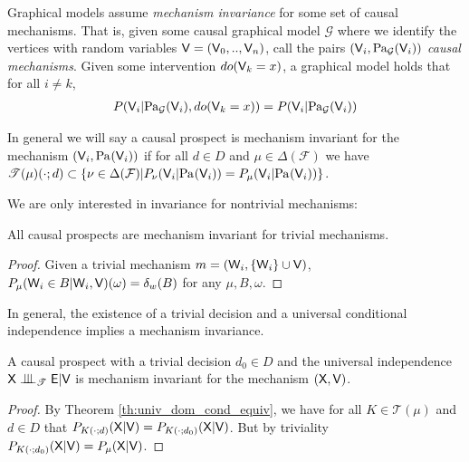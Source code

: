 Graphical models assume \emph{mechanism invariance} for some set of causal mechanisms. That is, given some causal graphical model $\mathcal{G}$ where we identify the vertices with random variables $\mathsf{V}=(\mathsf{V}_0,..,\mathsf{V}_n)$, call the pairs $(\mathsf{V}_i,\text{Pa}_{\mathcal{G}}(\mathsf{V}_i))$ \emph{causal mechanisms}. Given some intervention $do(\mathsf{V}_k=x)$, a graphical model holds that for all $i\neq k$, \begin{align}
    P(\mathsf{V}_i|\text{Pa}_{\mathcal{G}}(\mathsf{V}_i),do(\mathsf{V}_k=x)) = P(\mathsf{V}_i|\text{Pa}_{\mathcal{G}}(\mathsf{V}_i))
\end{align}

In general we will say a causal prospect is mechanism invariant for the mechanism $(\mathsf{V}_i,\text{Pa}_{}(\mathsf{V}_i))$ if for all $d\in D$ and $\mu\in \Delta(\mathcal{F})$ we have $\mathscr{T}(\mu)(\cdot;d)\subset \{\nu\in \Delta(\mathcal{F})| P_{\nu}(\mathsf{V}_i|\text{Pa}_{}(\mathsf{V}_i)) = P_\mu(\mathsf{V}_i|\text{Pa}_{}(\mathsf{V}_i))\}$.

We are only interested in invariance for nontrivial mechanisms:

\begin{theorem}\label{th:trivial_invariance}
All causal prospects are mechanism invariant for trivial mechanisms.
\end{theorem}

\begin{proof}
Given a trivial mechanism $m=(\mathsf{W}_i,\{\mathsf{W}_i\}\cup\mathsf{V})$, $P_\mu(\mathsf{W}_i\in B|\mathsf{W}_i,\mathsf{V})(\omega)=\delta_w(B)$ for any $\mu, B, \omega$.
\end{proof}

In general, the existence of a trivial decision and a universal conditional independence implies a mechanism invariance.

\begin{theorem}\label{th:univ_ti_mi}
A causal prospect with a trivial decision $d_0\in D$ and the universal independence $\RV{X}\CII_{\mathscr{T}} \RV{E} | \RV{V}$ is mechanism invariant for the mechanism $(\mathsf{X},\mathsf{V})$.
\end{theorem}

\begin{proof}
By Theorem \ref{th:univ_dom_cond_equiv}, we have for all $K\in \mathscr{T}(\mu)$ and $d\in D$ that $P_{K(\cdot;d)}(\mathsf{X}|\mathsf{V})=P_{K(\cdot;d_0)}(\mathsf{X}|\mathsf{V})$. But by triviality $P_{K(\cdot;d_0)}(\mathsf{X}|\mathsf{V})=P_\mu(\mathsf{X}|\mathsf{V})$.
\end{proof}

